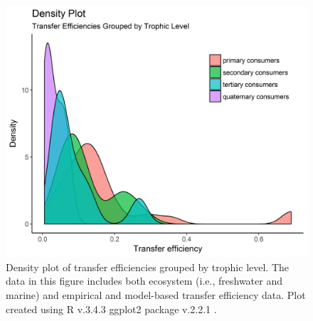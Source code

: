 \documentclass[oneside,12pt,final]{sty/ucthesis-CA2012}
\let\cite\citep                             %
\begin{document}
\begin{mainmatter}
\begin{figure}[H]
     \centering
       \includegraphics[width=.8\textwidth]{fig/density_te_by_tl}
    \caption{Density plot of transfer efficiencies grouped by trophic level. The data in this figure includes both ecosystem (i.e., freshwater and marine) and empirical and model-based transfer efficiency data. Plot created using R v.3.4.3 \cite{Rcite} ggplot2 package v.2.2.1 \cite{ggplot}. }
    \label{den_tl}
\end{figure}


\end{mainmatter}
\end{document}

